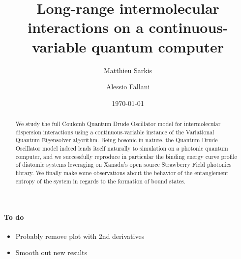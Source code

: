 \documentclass[reprint, amsmath, amssymb, floatfix, aps, pra]{revtex4-2}
\begin{document}
\preprint{}

\title{Long-range intermolecular interactions on a continuous-variable quantum computer}

\author{Matthieu Sarkis}

\author{Alessio Fallani}


\date{\today}

\begin{abstract}
    We study the full Coulomb Quantum Drude Oscillator model for intermolecular dispersion interactions using a continuous-variable instance of the Variational Quantum Eigensolver algorithm. Being bosonic in nature, the Quantum Drude Oscillator model indeed lends itself naturally to simulation on a photonic quantum computer, and we successfully reproduce in particular the binding energy curve profile of diatomic systems leveraging on Xanadu's open source Strawberry Field photonics library. We finally make some observations about the behavior of the entanglement entropy of the system in regards to the formation of bound states.
\end{abstract}


\maketitle


\paragraph*{To do}

\begin{itemize}
    \item Probably remove plot with 2nd derivatives
    \item Smooth out new results
\end{itemize}
\end{document}
